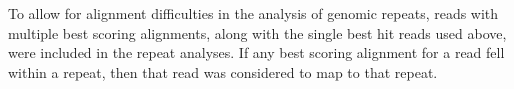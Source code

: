 \documentclass[../sherrill-Mix_thesis.tex]{subfiles}
\begin{document}
		To allow for alignment difficulties in the analysis of genomic repeats, reads with multiple best scoring alignments, along with the single best hit reads used above, were included in the repeat analyses. If any best scoring alignment for a read fell within a repeat, then that read was considered to map to that repeat. 
		
\end{document}
